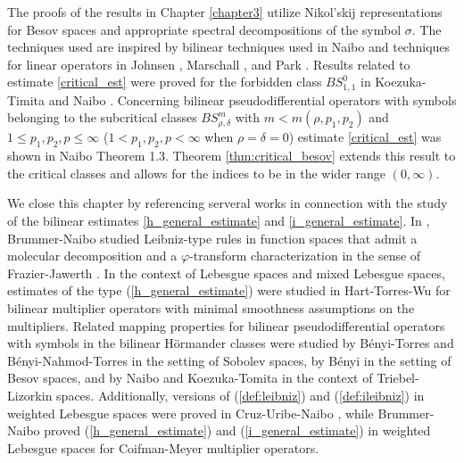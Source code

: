 The proofs of the results in Chapter \ref{chapter3} utilize Nikol'skij representations for Besov spaces and appropriate spectral decompositions of the symbol $\sigma$. The techniques used are inspired by bilinear techniques used in Naibo \cite{MR3393696} and techniques for linear operators in Johnsen \citep{MR2163627}, Marschall \citep{MR1376592}, and Park \citep{Park}. Results related to estimate \ref{critical_est} were proved for the forbidden class $BS^0_{1,1}$ in Koezuka-Timita \cite{MR3750316} and Naibo \citep{MR3393696}. Concerning bilinear pseudodifferential operators with symbols belonging to the subcritical classes $BS^m_{\rho,\delta}$ with $m<m(\rho,p_1,p_2)$ and $1\leq p_1,p_2,p \leq \infty$ ($1 < p_1,p_2,p < \infty$ when $\rho = \delta = 0$) estimate \ref{critical_est} was shown in Naibo \citep{MR3393696} Theorem 1.3. Theorem \ref{thm:critical_besov} extends this result to the critical classes and allows for the indices to be in the wider range $(0,\infty)$. 

We close this chapter by referencing serveral works in connection with the study of the bilinear estimates \eqref{h_general_estimate} and \eqref{i_general_estimate}. In \cite{MR3750234}, Brummer-Naibo studied Leibniz-type rules in function spaces that admit a molecular decomposition and a $\varphi$-transform characterization in the sense of Frazier-Jawerth \cite{MR808825, MR1070037}. In the context of Lebesgue spaces and mixed Lebesgue spaces, estimates of the type (\ref{h_general_estimate}) were studied in Hart-Torres-Wu \cite{HTW} for bilinear multiplier operators with minimal smoothness assumptions on the multipliers. Related mapping properties for bilinear pseudodifferential operators with symbols in the bilinear H\"ormander classes were studied by B\'enyi-Torres \cite{MR1986065} and B\'enyi-Nahmod-Torres \cite{MR2250054} in the setting of Sobolev spaces, by B\'enyi \cite{MR1996120} in the setting of Besov spaces, and by Naibo \cite{MR3393696} and Koezuka-Tomita \cite{MR3750316} in the context of Triebel-Lizorkin spaces. Additionally, versions of (\ref{def:leibniz}) and (\ref{def:ileibniz}) in weighted Lebesgue spaces were proved in Cruz-Uribe-Naibo \cite{MR3513582}, while Brummer-Naibo \cite{BrNa2017} proved (\ref{h_general_estimate}) and (\ref{i_general_estimate}) in weighted Lebesgue spaces for Coifman-Meyer multiplier operators. 


%
%
%


